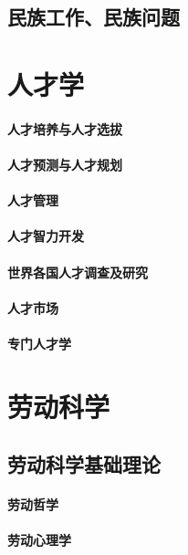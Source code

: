 \documentclass[UTF8]{../RepresentationUniverse}
\begin{document}
\section{民族工作、民族问题}



\chapter{人才学}
\subsubsection{人才培养与人才选拔}
\subsubsection{人才预测与人才规划}
\subsubsection{人才管理}
\subsubsection{人才智力开发}
\subsubsection{世界各国人才调查及研究}
\subsubsection{人才市场}
\subsubsection{专门人才学}





\chapter{劳动科学}
\section{劳动科学基础理论}
    \subsubsection{劳动哲学}
    \subsubsection{劳动心理学}
\end{document}

